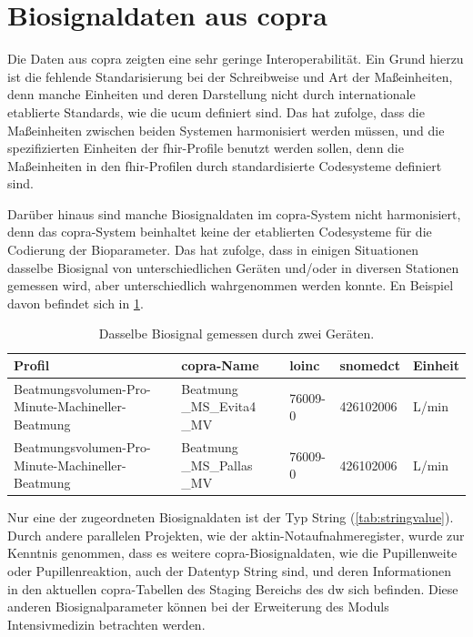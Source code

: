 \section{Biosignaldaten aus \acs{copra}} \label{sec:configvarcopradiscu}

Die Daten aus \ac{copra} zeigten eine sehr geringe Interoperabilität. Ein Grund hierzu ist die fehlende Standarisierung bei der Schreibweise und Art der Maßeinheiten, denn manche Einheiten und deren Darstellung nicht durch internationale etablierte Standards, wie die \ac{ucum} definiert sind. Das hat zufolge, dass die Maßeinheiten zwischen beiden Systemen harmonisiert werden müssen, und die spezifizierten Einheiten der \ac{fhir}-Profile benutzt werden sollen, denn die Maßeinheiten in den \ac{fhir}-Profilen durch standardisierte Codesysteme definiert sind. 

Darüber hinaus sind manche Biosignaldaten im \ac{copra}-System nicht harmonisiert, denn das \ac{copra}-System beinhaltet keine der etablierten Codesysteme für die Codierung der Bioparameter. Das hat zufolge, dass in einigen Situationen dasselbe Biosignal von unterschiedlichen Geräten und/oder in diversen Stationen gemessen wird, aber unterschiedlich wahrgenommen werden konnte. En Beispiel davon befindet sich in \ref{tab:sameprofilbiosig}.

\clearpage

 \begin{table}[ht]
 	\centering 
 	\caption[Dasselbe Biosignal gemessen durch zwei Geräten]{Dasselbe Biosignal gemessen durch zwei Geräten.}
 	\label{tab:sameprofilbiosig}
 	\begin{tabular}{|p{3.5cm}|p{2.4cm}|l|l|l|}
 		\hline
 		\rowcolor{lightgray} Profil & \ac{copra}-Name & \acs{loinc} & \ac{snomedct} & Einheit \\ \hline
 		Beatmungsvolumen-Pro-Minute-Machineller-Beatmung & Beatmung \_MS\_Evita4 \_MV & 76009-0 & 426102006 & L/min \\ \hline
 		Beatmungsvolumen-Pro-Minute-Machineller-Beatmung & Beatmung \_MS\_Pallas \_MV & 76009-0 & 426102006 & L/min \\ \hline
 	\end{tabular}
 \end{table}

Nur eine der zugeordneten Biosignaldaten ist der Typ String (\ref{tab:stringvalue}). Durch andere parallelen Projekten, wie der \ac{aktin}-Notaufnahmeregister, wurde zur Kenntnis genommen, dass es weitere \ac{copra}-Biosignaldaten, wie die Pupillenweite oder Pupillenreaktion, auch der Datentyp String sind, und deren Informationen in den aktuellen \ac{copra}-Tabellen des Staging Bereichs des \ac{dw} sich befinden. Diese anderen Biosignalparameter können bei der Erweiterung des Moduls \glqq Intensivmedizin\grqq{} betrachten werden.

